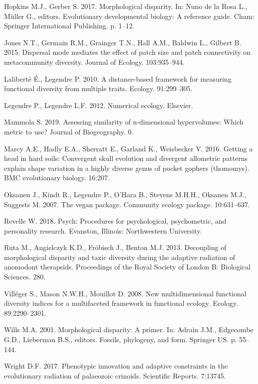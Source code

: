 \documentclass[]{article}
\begin{document}
\hypertarget{ref-hopkins2017}{}
Hopkins M.J., Gerber S. 2017. Morphological disparity. In: Nuno de la
Rosa L., Müller G., editors. Evolutionary developmental biology: A
reference guide. Cham: Springer International Publishing. p. 1--12.

\hypertarget{ref-jones2015}{}
Jones N.T., Germain R.M., Grainger T.N., Hall A.M., Baldwin L., Gilbert
B. 2015. Dispersal mode mediates the effect of patch size and patch
connectivity on metacommunity diversity. Journal of Ecology.
103:935--944.

\hypertarget{ref-lalibertuxe92010}{}
Laliberté É., Legendre P. 2010. A distance-based framework for measuring
functional diversity from multiple traits. Ecology. 91:299--305.

\hypertarget{ref-legendre2012}{}
Legendre P., Legendre L.F. 2012. Numerical ecology. Elsevier.

\hypertarget{ref-mammola2019}{}
Mammola S. 2019. Assessing similarity of n-dimensional hypervolumes:
Which metric to use? Journal of Biogeography. 0.

\hypertarget{ref-marcy2016}{}
Marcy A.E., Hadly E.A., Sherratt E., Garland K., Weisbecker V. 2016.
Getting a head in hard soils: Convergent skull evolution and divergent
allometric patterns explain shape variation in a highly diverse genus of
pocket gophers (thomomys). BMC evolutionary biology. 16:207.

\hypertarget{ref-oksanen2007vegan}{}
Oksanen J., Kindt R., Legendre P., O'Hara B., Stevens M.H.H., Oksanen
M.J., Suggests M. 2007. The vegan package. Community ecology package.
10:631--637.

\hypertarget{ref-psych}{}
Revelle W. 2018. Psych: Procedures for psychological, psychometric, and
personality research. Evanston, Illinois: Northwestern University.

\hypertarget{ref-ruta2013}{}
Ruta M., Angielczyk K.D., Fröbisch J., Benton M.J. 2013. Decoupling of
morphological disparity and taxic diversity during the adaptive
radiation of anomodont therapsids. Proceedings of the Royal Society of
London B: Biological Sciences. 280.

\hypertarget{ref-villuxe9ger2008}{}
Villéger S., Mason N.W.H., Mouillot D. 2008. New multidimensional
functional diversity indices for a multifaceted framework in functional
ecology. Ecology. 89:2290--2301.

\hypertarget{ref-wills2001}{}
Wills M.A. 2001. Morphological disparity: A primer. In: Adrain J.M.,
Edgecombe G.D., Lieberman B.S., editors. Fossils, phylogeny, and form.
Springer US. p. 55--144.

\hypertarget{ref-wright2017}{}
Wright D.F. 2017. Phenotypic innovation and adaptive constraints in the
evolutionary radiation of palaeozoic crinoids. Scientific Reports.
7:13745.
\end{document}
